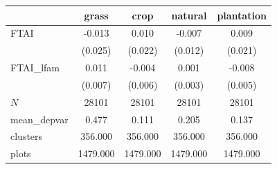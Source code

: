 {
\def\sym#1{\ifmmode^{#1}\else\(^{#1}\)\fi}
\begin{tabular}{l*{4}{c}}
\toprule
          &\multicolumn{1}{c}{grass}&\multicolumn{1}{c}{crop}&\multicolumn{1}{c}{natural}&\multicolumn{1}{c}{plantation}\\
\midrule
FTAI      &   -0.013   &    0.010   &   -0.007   &    0.009   \\
          &  (0.025)   &  (0.022)   &  (0.012)   &  (0.021)   \\
\addlinespace
FTAI\_lfam &    0.011   &   -0.004   &    0.001   &   -0.008   \\
          &  (0.007)   &  (0.006)   &  (0.003)   &  (0.005)   \\
\midrule
\(N\)     &    28101   &    28101   &    28101   &    28101   \\
mean\_depvar&    0.477   &    0.111   &    0.205   &    0.137   \\
clusters  &  356.000   &  356.000   &  356.000   &  356.000   \\
plots     & 1479.000   & 1479.000   & 1479.000   & 1479.000   \\
\bottomrule
\end{tabular}
}
